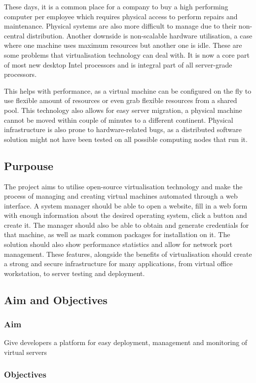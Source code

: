 \documentclass{article}
\begin{document}
  
  These days, it is a common place for a company to buy a high performing computer per employee which requires physical access to perform repairs and maintenance. Physical systems are also more difficult to manage due to their non-central distribution. Another downside is non-scalable hardware utilisation, a case where one machine uses maximum resources but another one is idle. These are some problems that virtualisation technology can deal with.  It is now a core part of most new desktop Intel processors and is integral part of all server-grade processors.
  
  This helps with performance, as a virtual machine can be configured on the fly to use flexible amount of resources or even grab flexible resources from a shared pool. This technology also allows for easy server migration, a physical machine cannot be moved within couple of minutes to a different continent. Physical infrastructure is also prone to hardware-related bugs, as a distributed software solution might not have been tested on all possible computing nodes that run it.
  
  \subsection{Purpouse}
   The project aims to utilise open-source virtualisation technology and make the process of managing and creating virtual machines automated through a web interface. A system manager should be able to open a website, fill in a web form with enough information about the desired operating system, click a button and create it. The manager should also be able to obtain and generate credentials for that machine, as well as mark common packages for installation on it. The solution should also show performance statistics and allow for network port management. These features, alongside the benefits of virtualisation should create a strong and secure infrastructure for many applications, from virtual office workstation, to server testing and deployment.
  \subsection{Aim and Objectives}
	  \subsubsection{Aim}
	  Give developers a platform for easy deployment, management and monitoring of virtual servers
	  \subsubsection{Objectives}
	  
\end{document}
